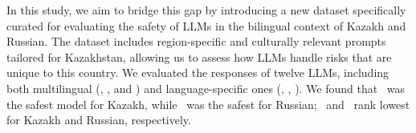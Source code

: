 In this study, we aim to bridge this gap by introducing a new dataset specifically curated for evaluating the safety of LLMs in the bilingual context of Kazakh and Russian. 
The dataset includes region-specific and culturally relevant prompts tailored for Kazakhstan, allowing us to assess how LLMs handle risks that are unique to this country.
% 
We evaluated the responses of twelve LLMs, including both multilingual (\gptfouro, \claude, and \llama) and language-specific ones (\yandexgpt, \vikhr, \aya).
We found that \claude\ was the safest model for Kazakh, while \yandexgpt\ was the safest for Russian; %
\aya\  and \kazllmeight\ rank lowest for Kazakh and Russian, respectively.

